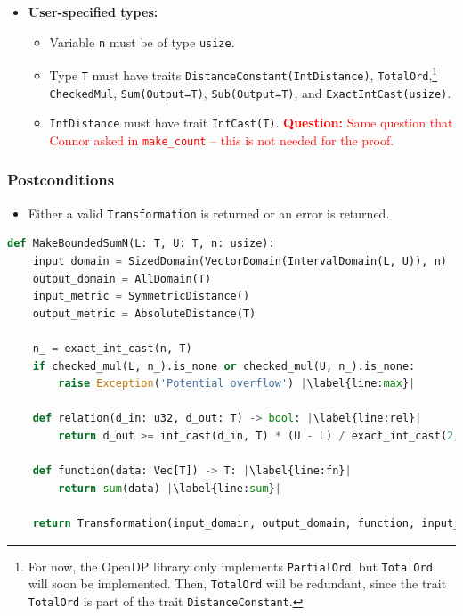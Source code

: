 \documentclass[11pt,a4paper]{article}
\theoremstyle{definition}
\newcommand{\questionc}[1]{\textcolor{red}{\textbf{Question:} #1}}
\begin{document}
\begin{itemize}
    \item \textbf{User-specified types:}
    \begin{itemize}
        \item Variable \texttt{n} must be of type \texttt{usize}.
        \item Type \texttt{T} must have traits \texttt{DistanceConstant(IntDistance)}, \texttt{TotalOrd},\footnote{For now, the OpenDP library only implements \texttt{PartialOrd}, but \texttt{TotalOrd} will soon be implemented. Then, \texttt{TotalOrd} will be redundant, since the trait \texttt{TotalOrd} is part of the trait \texttt{DistanceConstant}.} \texttt{CheckedMul}, \texttt{Sum(Output=T)}, \texttt{Sub(Output=T)},  and \texttt{ExactIntCast(usize)}.
        \item \texttt{IntDistance} must have trait \texttt{InfCast(T)}. \questionc{Same question that Connor asked in \texttt{make\_count} -- this is not needed for the proof.}
\end{itemize}
\end{itemize}

\subsubsection*{Postconditions}
\begin{itemize}
    \item Either a valid \texttt{Transformation} is returned or an error is returned.
\end{itemize}

\begin{lstlisting}[language=Python, escapechar=|]
def MakeBoundedSumN(L: T, U: T, n: usize):
    input_domain = SizedDomain(VectorDomain(IntervalDomain(L, U)), n)
    output_domain = AllDomain(T)
    input_metric = SymmetricDistance()
    output_metric = AbsoluteDistance(T)
    
    n_ = exact_int_cast(n, T)
    if checked_mul(L, n_).is_none or checked_mul(U, n_).is_none: 
        raise Exception('Potential overflow') |\label{line:max}|
    
    def relation(d_in: u32, d_out: T) -> bool: |\label{line:rel}|
        return d_out >= inf_cast(d_in, T) * (U - L) / exact_int_cast(2, T)
    
    def function(data: Vec[T]) -> T: |\label{line:fn}|
        return sum(data) |\label{line:sum}|
    
    return Transformation(input_domain, output_domain, function, input_metric, output_metric, stability_relation = Relation)
\end{lstlisting}
\end{document}

